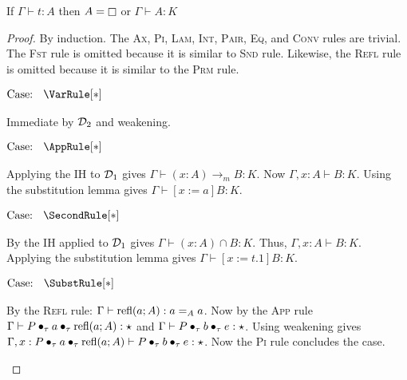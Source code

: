 \begin{lemma}
    \label{lem:2:classification}
    If $\Gamma \vdash t : A$ then $A = \kind$ or $\Gamma \vdash A : K$
\end{lemma}
\begin{proof}
    By induction.
    The \textsc{Ax}, \textsc{Pi}, \textsc{Lam}, \textsc{Int}, \textsc{Pair}, \textsc{Eq}, and \textsc{Conv} rules are trivial.
    The \textsc{Fst} rule is omitted because it is similar to \textsc{Snd} rule.
    Likewise, the \textsc{Refl} rule is omitted because it is similar to the \textsc{Prm} rule.

    $\text{Case: }\begin{array}{c} \VarRule[*] \end{array}$
    \begin{proofcase}
        Immediate by $\mathcal{D}_{2}$ and weakening.
    \end{proofcase}

    $\text{Case: }\begin{array}{c} \AppRule[*] \end{array}$
    \begin{proofcase}
        Applying the IH to $\mathcal{D}_{1}$ gives $\Gamma \vdash (x : A) \to_m B : K$.
        Now $\Gamma, x : A \vdash B : K$.
        Using the substitution lemma gives $\Gamma \vdash [x := a]B : K$.
    \end{proofcase}

    $\text{Case: }\begin{array}{c} \SecondRule[*] \end{array}$
    \begin{proofcase}
        By the IH applied to $\mathcal{D}_{1}$ gives $\Gamma \vdash (x : A )\cap B : K$.
        Thus, $\Gamma, x : A \vdash B : K$.
        Applying the substitution lemma gives $\Gamma \vdash [x := t.1]B : K$.
    \end{proofcase}

    $\text{Case: }\begin{array}{c} \SubstRule[*] \end{array}$
    \begin{proofcase}
        By the \textsc{Refl} rule: $\Gamma \vdash \textnormal{refl}(a;A) : a =_A a$.
        Now by the \textsc{App} rule $\Gamma \vdash P \bullet_{\tau} a \bullet_{\tau} \textnormal{refl}(a;A) : \star$ and $\Gamma \vdash P \bullet_{\tau} b \bullet_{\tau} e : \star$.
        Using weakening gives $\Gamma, x : P \bullet_{\tau} a \bullet_{\tau} \textnormal{refl}(a;A) \vdash P \bullet_{\tau} b \bullet_{\tau} e : \star$.
        Now the \textsc{Pi} rule concludes the case.
    \end{proofcase}


\end{proof}
